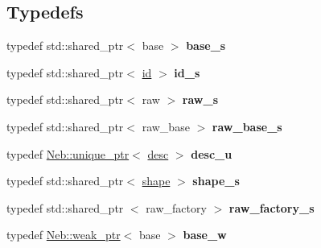 \subsection*{\-Typedefs}
\begin{DoxyCompactItemize}
\item 
\hypertarget{namespaceNeb_1_1Shape_acf916d5c0fef3a80b1a462db395572db}{typedef std\-::shared\-\_\-ptr$<$ base $>$ {\bfseries base\-\_\-s}}\label{namespaceNeb_1_1Shape_acf916d5c0fef3a80b1a462db395572db}

\item 
\hypertarget{namespaceNeb_1_1Shape_ad7c7e0ce9fad62f8251843de2172047f}{typedef std\-::shared\-\_\-ptr$<$ \hyperlink{classNeb_1_1Shape_1_1id}{id} $>$ {\bfseries id\-\_\-s}}\label{namespaceNeb_1_1Shape_ad7c7e0ce9fad62f8251843de2172047f}

\item 
\hypertarget{namespaceNeb_1_1Shape_ad8449a7619311d24ee47aed2873c1bff}{typedef std\-::shared\-\_\-ptr$<$ raw $>$ {\bfseries raw\-\_\-s}}\label{namespaceNeb_1_1Shape_ad8449a7619311d24ee47aed2873c1bff}

\item 
\hypertarget{namespaceNeb_1_1Shape_a0fe905f52e985a9140f8336d502c0d29}{typedef std\-::shared\-\_\-ptr$<$ raw\-\_\-base $>$ {\bfseries raw\-\_\-base\-\_\-s}}\label{namespaceNeb_1_1Shape_a0fe905f52e985a9140f8336d502c0d29}

\item 
\hypertarget{namespaceNeb_1_1Shape_a583846ba17d4bd693b2b471e6009cbb0}{typedef \hyperlink{classNeb_1_1unique__ptr}{\-Neb\-::unique\-\_\-ptr}$<$ \hyperlink{classNeb_1_1Shape_1_1desc}{desc} $>$ {\bfseries desc\-\_\-u}}\label{namespaceNeb_1_1Shape_a583846ba17d4bd693b2b471e6009cbb0}

\item 
\hypertarget{namespaceNeb_1_1Shape_a931f5b6d2a3c1492b47f2a1de08426ae}{typedef std\-::shared\-\_\-ptr$<$ \hyperlink{classNeb_1_1Shape_1_1shape}{shape} $>$ {\bfseries shape\-\_\-s}}\label{namespaceNeb_1_1Shape_a931f5b6d2a3c1492b47f2a1de08426ae}

\item 
\hypertarget{namespaceNeb_1_1Shape_a4eb1c1c4255537d6695efc7c2b8c61df}{typedef std\-::shared\-\_\-ptr\*
$<$ raw\-\_\-factory $>$ {\bfseries raw\-\_\-factory\-\_\-s}}\label{namespaceNeb_1_1Shape_a4eb1c1c4255537d6695efc7c2b8c61df}

\item 
\hypertarget{namespaceNeb_1_1Shape_a54a2f0eb334cc741bd95f29d7e337d04}{typedef \hyperlink{classNeb_1_1weak__ptr}{\-Neb\-::weak\-\_\-ptr}$<$ base $>$ {\bfseries base\-\_\-w}}\label{namespaceNeb_1_1Shape_a54a2f0eb334cc741bd95f29d7e337d04}


\end{DoxyCompactItemize}
